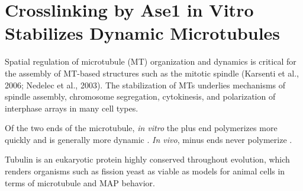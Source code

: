 \section{Crosslinking by Ase1 in Vitro Stabilizes Dynamic Microtubules}
Spatial regulation of microtubule (MT) organization and dynamics is critical for the assembly of MT-based structures such as the mitotic spindle (Karsenti et al., 2006; Nedelec et al., 2003). The stabilization of MTs underlies mechanisms of spindle assembly, chromosome segregation, cytokinesis, and polarization of interphase arrays in many cell types. 


 Of the two ends of the microtubule, \textit{in vitro} the plus end polymerizes more quickly and is generally more dynamic \parencite{Howard2003}. \textit{In vivo}, minus ends never polymerize \parencite{dammer}. %
 \FloatBarrier
 
 Tubulin is an eukaryotic protein highly conserved throughout evolution, which renders organisms such as fission yeast as viable as models for animal cells in terms of microtubule and MAP behavior.